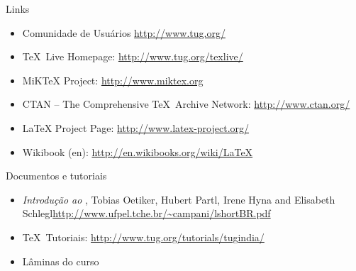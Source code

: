 \begin{frame}{Links}
  \begin{itemize}
    \item Comunidade de Usuários \scriptsize{\url{http://www.tug.org/}}
    \item \normalsize{\TeX\ Live Homepage: }\scriptsize{\url{http://www.tug.org/texlive/}}
    \item \normalsize{MiK\TeX{} Project: }\scriptsize{\url{http://www.miktex.org}}
    \item \normalsize{CTAN -- The Comprehensive \TeX\ Archive Network: }\scriptsize{\url{http://www.ctan.org/}}
    \item \normalsize{\LaTeX{} Project Page: }\scriptsize{\url{http://www.latex-project.org/}}
    \item \normalsize{Wikibook (en): }\scriptsize{\url{http://en.wikibooks.org/wiki/LaTeX}}
  \end{itemize}
\end{frame}

\begin{frame}{Documentos e tutoriais}
	\begin{itemize}
		\item \emph{Introdução ao \LaTeXe}, Tobias Oetiker, Hubert Partl, Irene Hyna and Elisabeth Schlegl\n\scriptsize{\url{http://www.ufpel.tche.br/~campani/lshortBR.pdf}}
		\item \normalsize{\TeX\ Tutoriais: }\scriptsize{\url{http://www.tug.org/tutorials/tugindia/}}
		\item \normalsize{Lâminas do curso}%
	\end{itemize}
\end{frame}
